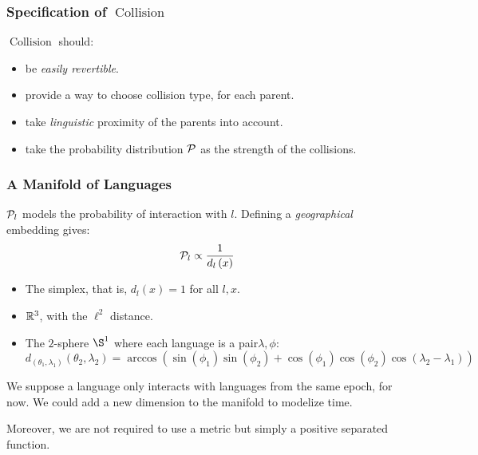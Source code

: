 \documentclass[ratio=169]{beamercours}
\DeclareMathOperator{\coll}{Collision}
\begin{document}
\begin{frame}
	\frametitle{Specification of $\coll$}
	$\coll$ should:
	\begin{itemize}[<+->]
		\item be \emph{easily revertible}.
		\item provide a way to choose collision type, for each parent.
		\item take \emph{linguistic} proximity of the parents into account.
		\item take the probability distribution $\mathcal{P}$ as the strength of the collisions.
	\end{itemize}
\end{frame}


\begin{frame}[allowframebreaks]
	\frametitle{A Manifold of Languages}
	$\mathcal{P}_{l}$ models the probability of interaction with $l$.
	Defining a \emph{geographical} embedding gives:
	\begin{equation*}
		\mathcal{P}_{l} \propto \frac{1}{d_{l}\left( x \right)}
	\end{equation*}

	\framebreak

	\begin{itemize}
		\item The simplex, that is, $d_{l}(x) = 1$ for all $l, x$.
		\item $\mathbb{R}^{3}$, with the $\ell^{2}$ distance.
		\item The $2$-sphere $\S^{1}$ where each language is a pair$\lambda, \phi$:
	      \begin{equation*}
		      d_{\left( \theta_{1}, \lambda_{1} \right)}\left( \theta_{2}, \lambda_{2} \right) = \arccos\left( \sin \left(\phi_{1}\right) \sin\left( \phi_{2} \right) + \cos\left( \phi_{1} \right)\cos\left( \phi_{2} \right)\cos\left( \lambda_{2} - \lambda_{1} \right) \right)
	      \end{equation*}
	\end{itemize}

	\framebreak

	We suppose a language only interacts with languages from the same epoch, for now.
	We could add a new dimension to the manifold to modelize time.

	Moreover, we are not required to use a metric but simply a positive separated function.

\end{frame}
\end{document}
